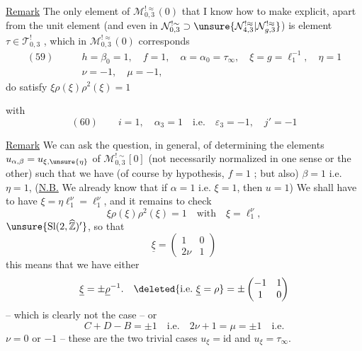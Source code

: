 \uline{Remark} The only element of
$\mathcal M_{0,3}^{!\approx}(0)$
that I know how to make explicit, apart from the unit element
(and  even in
$\mathcal N_{0,3}^{!\sim}\supset
\unsure{\mathcal N_{4,3}^{!\approx}|\mathcal N_{g,3}^{!\approx}}$)
is  element
$\tau\in\mathcal T_{0,3}^{!}$
,
which in $\mathcal M_{0,3}^{!\approx}(0)$ corresponds
\[
\begin{aligned}
(59)\qquad & h=\beta_0=1,\quad f=1,\quad
\alpha=\alpha_0=\tau_\infty,\quad
\xi=g=\ell_1^{-1},\quad\eta=1
\\
&\nu=-1,\quad\mu=-1,
\end{aligned}
\]
do satisfy 
\uline{$\xi\rho(\xi)
\rho^2(\xi)=1$}
\deleted{
\[
\widehat\varphi(\xi)=\ell_0,\qquad
\widehat\varphi\bigl(\unsure{\rho^{-1}}(\xi^{-1})\bigr)
=\unsure{\varepsilon_0},
\]
\[
\widehat\varphi\bigl(\rho^{-1}(\xi^{-1})\bigr)
\rho\bigl(\widehat\varphi(\rho^{-1}(\xi^{-1}))\bigr)^{-1}
=\unsure{\varepsilon_0\varepsilon_1^{-1}}
=(\sigma_\infty\rho)(\rho\sigma_\infty)^{-1}.
\]
}


with
\[
(60)\qquad i=1,\quad\alpha_3=1\quad\text{i.e.}\quad
\varepsilon_3=-1,\quad j'=-1
\]

\uline{Remark} We can ask the question, in general,
of determining the elements
$u_{\alpha,\beta}=u_{\xi,\unsure{\eta}}$
of $\mathcal M_{0,3}^{!\sim}[0]$
(not necessarily normalized in one sense or the other)
such that we have (of course by hypothesis, $f=1$ ; but also)
 $\beta=1$ i.e. $\eta=1$,
 
(\uline{N.B.} We already know that if $\alpha=1$ i.e.
$\xi=1$, then $u=1$)
We shall have to have
$\xi=\eta\ell_1^\nu=\ell_1^\nu$,
and it remains to check
\[
\xi\rho(\xi)
\rho^2(\xi)=1\quad\text{with}\quad
\xi=\ell_1^\nu,
\]
$\unsure{\mathrm{Sl}(2,\widehat{\mathbb Z})'}$,
 so that
\[
\underline{\xi}=
\begin{pmatrix}1&0\\2\nu&1\end{pmatrix}
\]
this means  that we have either
\[
\underline{\xi}=\pm\underline\rho^{-1}.
\quad\deleted{\text{i.e.}\ \underline{\xi}=\rho}
=\pm\begin{pmatrix}-1&1\\1&0\end{pmatrix}
\]
-- which is clearly not the case -- or
\[
C+D-B=\pm1\quad\text{i.e.}\quad2\nu+1=\mu=\pm1\quad\text{i.e.}
\]
$\nu=0$ or $-1$ -- these are the two trivial cases
$u_{\xi}=\mathrm{id}$ and
$u_{\xi}=\tau_\infty$.

